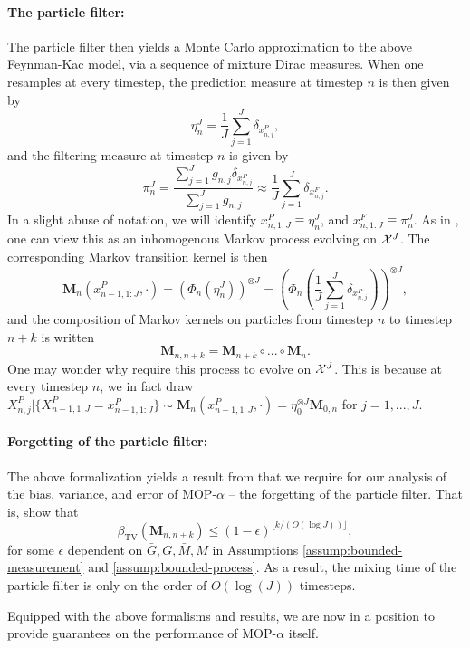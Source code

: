 \paragraph{The particle filter:} The particle filter then yields a Monte Carlo approximation to the above Feynman-Kac model, via a sequence of mixture Dirac measures. When one resamples at every timestep, the prediction measure at timestep $n$ is then given by 
\begin{equation}
\eta_n^J = \frac{1}{J}\sum_{j=1}^J \delta_{x_{n,j}^P},
\end{equation}
and the filtering measure at timestep $n$ is given by
\begin{equation}
\pi_n^J = \frac{\sum_{j=1}^J g_{n,j} \delta_{x_{n,j}^P}}{\sum_{j=1}^J g_{n,j}} \approx \frac{1}{J} \sum_{j=1}^J \delta_{x_{n,j}^F}.
\end{equation}
In a slight abuse of notation, we will identify $x_{n, 1:J}^P \equiv \eta_n^J$, and $x_{n, 1:J}^F \equiv \pi_n^J$. 
As in \cite{karjalainen23}, one can view this as an inhomogenous Markov process evolving on ${\mathcal{X}}^{J}$. The corresponding Markov transition kernel is then 
\begin{equation}
\textbf{M}_n(x_{n-1, 1:J}^P, \cdot) = \left(\Phi_{n}\left(\eta_n^J\right)\right)^{\otimes J} = \left(\Phi_{n}\left(\frac{1}{J}\sum_{j=1}^J \delta_{x_{n,j}^P}\right)\right)^{\otimes J},
\end{equation}
and the composition of Markov kernels on particles from timestep $n$ to timestep $n+k$ is written 
\begin{equation}
\textbf{M}_{n, n+k} = \textbf{M}_{n+k}\circ ...\circ \textbf{M}_n.
\end{equation}
One may wonder why \cite{karjalainen23} require this process to evolve on ${\mathcal{X}}^{J}$. This is because at every timestep $n$, we in fact draw $X_{n, j}^P | \{X_{n-1, 1:J}^P = x_{n-1, 1:J}^P\} \sim \textbf{M}_n(x_{n-1, 1:J}^P, \cdot) = \eta_0^{\otimes J} \textbf{M}_{0,n}$ for $j=1,...,J$. 

\paragraph{Forgetting of the particle filter:} 
The above formalization yields a result from \cite{karjalainen23} that we require for our analysis of the bias, variance, and error of MOP-$\alpha$ -- the forgetting of the particle filter. That is, \cite{karjalainen23} show that
\begin{equation}
\beta_{\mathrm{TV}}\left(\mathbf{M}_{n, n+k}\right) \leq(1-\epsilon)^{\lfloor k /(O(\log J))\rfloor},
\end{equation}
for some $\epsilon$ dependent on $\bar{G}, \underbar{G}, \bar{M}, \underbar{M}$ in Assumptions \ref{assump:bounded-measurement} and \ref{assump:bounded-process}. As a result, the mixing time of the particle filter is only on the order of $O(\log(J))$ timesteps. 


\vspace{3mm}

Equipped with the above formalisms and results, we are now in a position to provide guarantees on the performance of MOP-$\alpha$ itself. 
